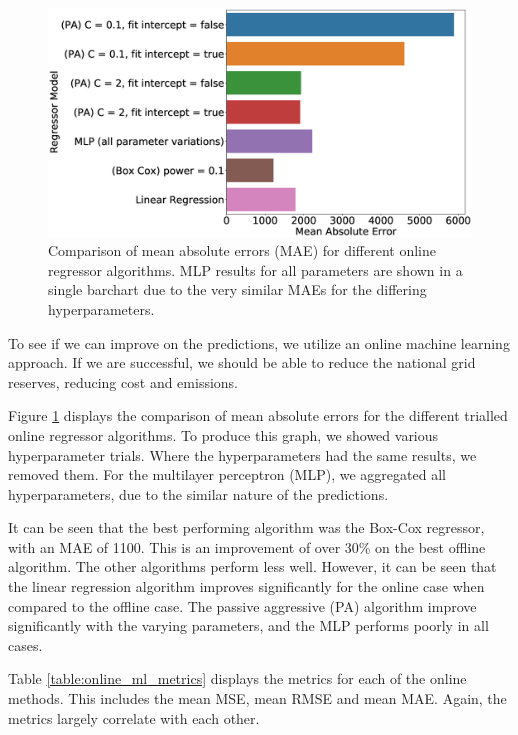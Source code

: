 \documentclass[final,3p,times,twocolumn,numbers]{elsarticle}
\begin{document}
\begin{figure}[h]
\centering
\includegraphics[width=0.8\columnwidth,natwidth=1300,natheight=750]{figures/results/online_model_mae_barplot.eps}
\caption{Comparison of mean absolute errors (MAE) for different online regressor algorithms. MLP results for all parameters are shown in a single barchart due to the very similar MAEs for the differing hyperparameters.}
\label{fig:online_model_mae_barplot}
\end{figure}



To see if we can improve on the predictions, we utilize an online machine learning approach. If we are successful, we should be able to reduce the national grid reserves, reducing cost and emissions.


Figure \ref{fig:online_model_mae_barplot} displays the comparison of mean absolute errors for the different trialled online regressor algorithms. To produce this graph, we showed various hyperparameter trials. Where the hyperparameters had the same results, we removed them. For the multilayer perceptron (MLP), we aggregated all hyperparameters, due to the similar nature of the predictions.

It can be seen that the best performing algorithm was the Box-Cox regressor, with an MAE of 1100. This is an improvement of over 30\% on the best offline algorithm. The other algorithms perform less well. However, it can be seen that the linear regression algorithm improves significantly for the online case when compared to the offline case. The passive aggressive (PA) algorithm improve significantly with the varying parameters, and the MLP performs poorly in all cases.


Table \ref{table:online_ml_metrics} displays the metrics for each of the online methods. This includes the mean MSE, mean RMSE and mean MAE. Again, the metrics largely correlate with each other.
\end{document}
